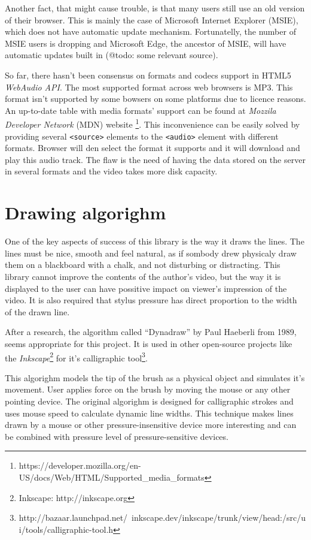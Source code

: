 Another fact, that might cause trouble, is that many users still use an old version of their browser. This is mainly the case of Microsoft Internet Explorer (MSIE), which does not have automatic update mechanism. Fortunatelly, the number of MSIE users is dropping and Microsoft Edge, the ancestor of MSIE, will have automatic updates built in (@todo: some relevant source).

So far, there hasn't been consensus on formats and codecs support in HTML5 \textit{WebAudio API}. The most supported format across web browsers is MP3. This format isn't supported by some bowsers on some platforms due to licence reasons. An up-to-date table with media formats' support can be found at \textit{Mozzila Developer Network} (MDN) website  \cite{} \footnote{https://developer.mozilla.org/en-US/docs/Web/HTML/Supported\_media\_formats}. This inconvenience can be easily solved by providing several \verb|<source>| elements to the \verb|<audio>| element with different formats. Browser will den select the format it supports and it will download and play this audio track. The flaw is the need of having the data stored on the server in several formats and the video takes more disk capacity.





\section{Drawing algorighm}
One of the key aspects of success of this library is the way it draws the lines. The lines must be nice, smooth and feel natural, as if sombody drew physicaly draw them on a blackboard with a chalk, and not disturbing or distracting. This library cannot improve the contents of the author's video, but the way it is displayed to the user can have possitive impact on viewer's impression of the video. It is also required that stylus pressure has direct proportion to the width of the drawn line.

After a research, the algorithm called ``Dynadraw'' by Paul Haeberli \cite{dyna_draw} from 1989, seems appropriate for this project. It is used in other open-source projects like the \textit{Inkscape}\footnote{Inkscape: http://inkscape.org} for it's calligraphic tool\footnote{http://bazaar.launchpad.net/~inkscape.dev/inkscape/trunk/view/head:/src/ui/tools/calligraphic-tool.h}.

This algorighm models the tip of the brush as a physical object and simulates it's movement. User applies force on the brush by moving the mouse or any other pointing device. The original algorighm is designed for calligraphic strokes and uses mouse speed to calculate dynamic line widths. This technique makes lines drawn by a mouse or other pressure-insensitive device more interesting and can be combined with pressure level of pressure-sensitive devices.

